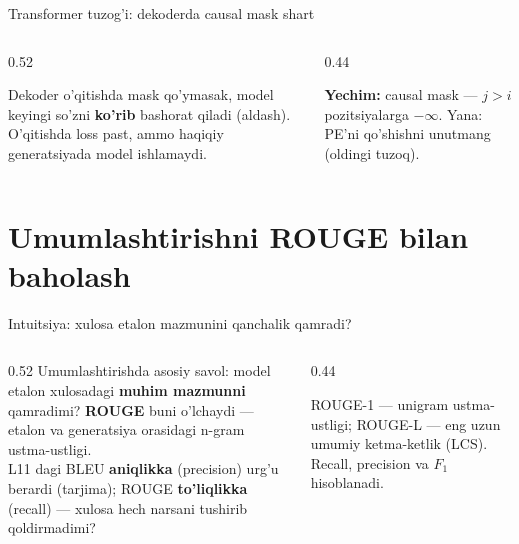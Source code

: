 \documentclass[aspectratio=169,11pt]{beamer}
\begin{document}
\begin{frame}{Transformer tuzog'i: dekoderda causal mask shart}
  \begin{columns}[T]
    \begin{column}{0.52\textwidth}
      \begin{tcolorbox}[warnbox,title={Mask'ni unutish}]
        \small
        Dekoder o'qitishda mask qo'ymasak, model keyingi so'zni
        \textbf{ko'rib} bashorat qiladi (aldash). O'qitishda loss past, ammo
        haqiqiy generatsiyada model ishlamaydi.
      \end{tcolorbox}
    \end{column}
    \begin{column}{0.44\textwidth}
      \begin{tcolorbox}[okbox,top=2pt,bottom=2pt]
        \footnotesize
        \textbf{Yechim:} causal mask --- $j>i$ pozitsiyalarga $-\infty$.
        Yana: PE'ni qo'shishni unutmang (oldingi tuzoq).
      \end{tcolorbox}
    \end{column}
  \end{columns}
\end{frame}

\section[ROUGE]{Umumlashtirishni ROUGE bilan baholash}

\begin{frame}{Intuitsiya: xulosa etalon mazmunini qanchalik qamradi?}
  \begin{columns}[T]
    \begin{column}{0.52\textwidth}
      \small
      Umumlashtirishda asosiy savol: model etalon xulosadagi \textbf{muhim
      mazmunni} qamradimi? \textbf{ROUGE} buni o'lchaydi --- etalon va
      generatsiya orasidagi n-gram ustma-ustligi.\\[5pt]
      L11 dagi BLEU \textbf{aniqlikka} (precision) urg'u berardi (tarjima);
      ROUGE \textbf{to'liqlikka} (recall) --- xulosa hech narsani
      tushirib qoldirmadimi?
    \end{column}
    \begin{column}{0.44\textwidth}
      \begin{tcolorbox}[okbox,top=2pt,bottom=2pt]
        \footnotesize
        ROUGE-1 --- unigram ustma-ustligi; ROUGE-L --- eng uzun umumiy
        ketma-ketlik (LCS). Recall, precision va $F_1$ hisoblanadi.
      \end{tcolorbox}
    \end{column}
  \end{columns}
\end{frame}
\end{document}
